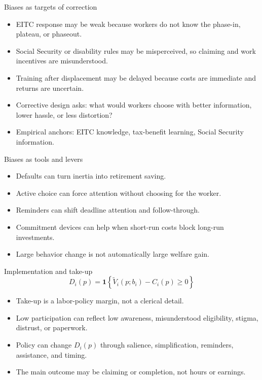 \documentclass[aspectratio=169,11pt]{beamer}
\begin{document}
\begin{frame}{Biases as targets of correction}
\begin{itemize}
    \item EITC response may be weak because workers do not know the phase-in, plateau, or phaseout.
    \item Social Security or disability rules may be misperceived, so claiming and work incentives are misunderstood.
    \item Training after displacement may be delayed because costs are immediate and returns are uncertain.
    \item Corrective design asks: what would workers choose with better information, lower hassle, or less distortion?
    \item Empirical anchors: EITC knowledge, tax-benefit learning, Social Security information.
\end{itemize}
\end{frame}

\begin{frame}{Biases as tools and levers}
\begin{itemize}
    \item Defaults can turn inertia into retirement saving.
    \item Active choice can force attention without choosing for the worker.
    \item Reminders can shift deadline attention and follow-through.
    \item Commitment devices can help when short-run costs block long-run investments.
    \item Large behavior change is not automatically large welfare gain.
\end{itemize}
\end{frame}

\begin{frame}{Implementation and take-up}
\[
D_i(p) = \mathbf{1}\!\left\{\tilde V_i(p; b_i) - C_i(p) \ge 0\right\}
\]

\begin{itemize}
    \item Take-up is a labor-policy margin, not a clerical detail.
    \item Low participation can reflect low awareness, misunderstood eligibility, stigma, distrust, or paperwork.
    \item Policy can change $D_i(p)$ through salience, simplification, reminders, assistance, and timing.
    \item The main outcome may be claiming or completion, not hours or earnings.
\end{itemize}
\end{frame}
\end{document}
